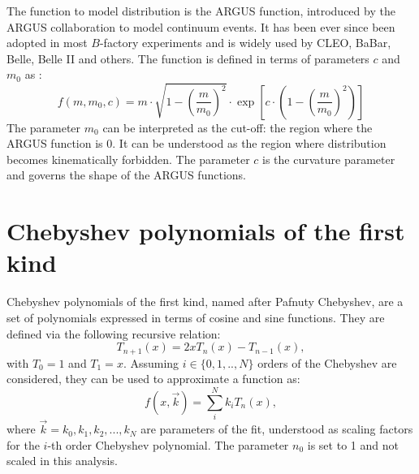 The function to model \epem\ra\qqbar distribution is the ARGUS function, introduced by the ARGUS collaboration to model continuum events.
It has been ever since been adopted in most $B$-factory experiments and is widely used by CLEO, BaBar, Belle, Belle II and others.
The function is defined in terms of parameters $c$ and $m_0$ as \cite{ARGUS:1990hfq}:
\begin{equation}\label{eq:argus_function}
    f(m, m_0, c) = m \cdot \sqrt{ 1 - \left( \frac{m}{m_0} \right)^2}
    \cdot \exp\left[ c \cdot \left(1 - \left(\frac{m}{m_0}\right)^2 \right) \right]
\end{equation}
The parameter $m_0$ can be interpreted as the cut-off: the region where the ARGUS function is 0.
It can be understood as the region where \Mbc distribution becomes kinematically forbidden.
The parameter $c$ is the curvature parameter and governs the shape of the ARGUS functions.

\section{Chebyshev polynomials of the first kind}\label{sec:chebyshev_distribution}
Chebyshev polynomials of the first kind, named after Pafnuty Chebyshev, are a set of polynomials expressed in terms of cosine and sine functions.
They are defined via the following recursive relation:
\begin{equation}\label{eq:chebyshev_generator}
    T_{n+1}(x) = 2xT_n(x) - T_{n-1}(x),
\end{equation}
with $T_0=1$ and $T_1=x$.
Assuming $i\in\{0,1,.., N\}$ orders of the Chebyshev are considered, they can be used to approximate a function as:
\begin{equation}\label{eq:chebyshev_pdf}
    f(x, \vec{k}) = \sum_i^N k_i T_n(x),
\end{equation}
where $\vec{k}={k_0,k_1,k_2,...,k_N}$ are parameters of the fit, understood as scaling factors for the $i$-th order Chebyshev polynomial.
The parameter $n_0$ is set to 1 and not scaled in this analysis. 